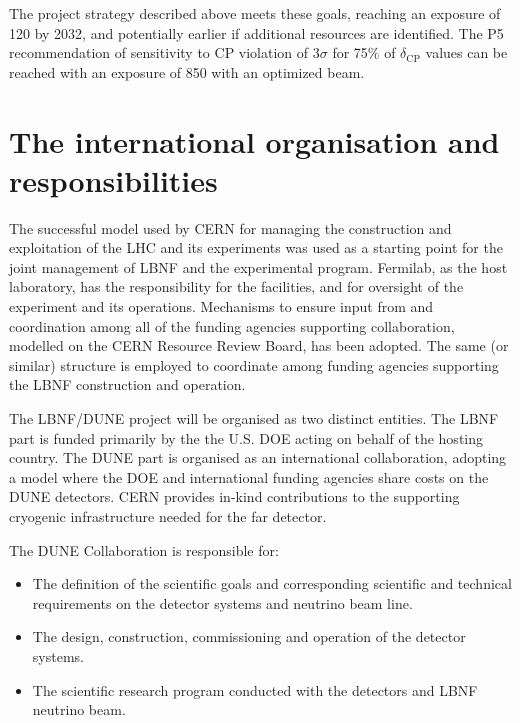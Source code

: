 \vspace{6pt}
The project strategy described above meets these goals, reaching an exposure of 
\num{120}\ktMWyr{} by 2032, and potentially earlier if additional resources are identified. 
The P5 recommendation of sensitivity to CP violation of 3$\sigma$ for 75\% of $\delta_\text{CP}$
values can be reached with an exposure of \num{850}\ktMWyr{} with an optimized beam.

\section{The international organisation and responsibilities}
The successful model used by CERN for managing the construction and exploitation of the LHC and its experiments was used as a starting point for the joint management of LBNF and the experimental program.  Fermilab, as the host laboratory, has the responsibility for the facilities, and for oversight of the experiment and its operations.  Mechanisms to ensure input from and coordination among all of the funding agencies supporting collaboration, modelled on the CERN Resource Review Board, has been adopted. The same (or similar) structure is employed to coordinate among funding agencies supporting the LBNF construction and operation.  

The LBNF/DUNE project will be organised as two distinct entities. The LBNF part is funded primarily
by the the U.S. DOE acting on behalf of the hosting country. The DUNE part is organised
as an international collaboration, adopting a model where the DOE and international funding agencies  share costs on the DUNE detectors. CERN provides in-kind contributions to the supporting cryogenic infrastructure needed for the far detector.

The DUNE Collaboration is responsible for:
\begin{itemize}
\item The definition of the scientific goals and corresponding scientific and technical requirements on the detector systems and neutrino beam line.
\item The design, construction, commissioning and operation of the detector systems.
\item The scientific research program conducted with the detectors and LBNF neutrino beam.
\end{itemize}

